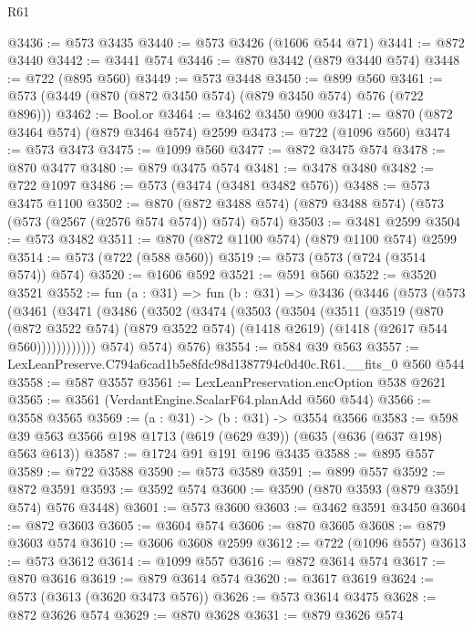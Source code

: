 \begin{lexlean}{R61}
\begin{coremodule}
@3436 := @573 @3435
@3440 := @573 @3426 (@1606 @544 @71)
@3441 := @872 @3440
@3442 := @3441 @574
@3446 := @870 @3442 (@879 @3440 @574)
@3448 := @722 (@895 @560)
@3449 := @573 @3448
@3450 := @899 @560
@3461 := @573 (@3449 (@870 (@872 @3450 @574) (@879 @3450 @574) @576 (@722 @896)))
@3462 := Bool.or
@3464 := @3462 @3450 @900
@3471 := @870 (@872 @3464 @574) (@879 @3464 @574) @2599
@3473 := @722 (@1096 @560)
@3474 := @573 @3473
@3475 := @1099 @560
@3477 := @872 @3475 @574
@3478 := @870 @3477
@3480 := @879 @3475 @574
@3481 := @3478 @3480
@3482 := @722 @1097
@3486 := @573 (@3474 (@3481 @3482 @576))
@3488 := @573 @3475 @1100
@3502 := @870 (@872 @3488 @574) (@879 @3488 @574) (@573 (@573 (@2567 (@2576 @574 @574)) @574) @574)
@3503 := @3481 @2599
@3504 := @573 @3482
@3511 := @870 (@872 @1100 @574) (@879 @1100 @574) @2599
@3514 := @573 (@722 (@588 @560))
@3519 := @573 (@573 (@724 (@3514 @574)) @574)
@3520 := @1606 @592
@3521 := @591 @560
@3522 := @3520 @3521
@3552 := fun (a : @31) =>
  fun (b : @31) =>
  @3436
    (@3446
      (@573
        (@573
          (@3461
            (@3471
              (@3486
                (@3502
                  (@3474
                    (@3503
                      (@3504
                        (@3511
                          (@3519
                            (@870
                              (@872 @3522 @574)
                              (@879 @3522 @574)
                              (@1418 @2619)
                              (@1418 (@2617 @544 @560))))))))))))
          @574)
        @574)
      @576)
@3554 := @584 @39 @563
@3557 := LexLeanPreserve.C794a6cad1b5e8fdc98d1387794c0d40c.R61.__fits_0 @560 @544
@3558 := @587 @3557
@3561 := LexLeanPreservation.encOption @538 @2621
@3565 := @3561 (VerdantEngine.ScalarF64.planAdd @560 @544)
@3566 := @3558 @3565
@3569 := (a : @31) -> (b : @31) -> @3554 @3566
@3583 := @598 @39 @563 @3566 @198 @1713 (@619 (@629 @39)) (@635 (@636 (@637 @198) @563 @613))
@3587 := @1724 @91 @191 @196 @3435
@3588 := @895 @557
@3589 := @722 @3588
@3590 := @573 @3589
@3591 := @899 @557
@3592 := @872 @3591
@3593 := @3592 @574
@3600 := @3590 (@870 @3593 (@879 @3591 @574) @576 @3448)
@3601 := @573 @3600
@3603 := @3462 @3591 @3450
@3604 := @872 @3603
@3605 := @3604 @574
@3606 := @870 @3605
@3608 := @879 @3603 @574
@3610 := @3606 @3608 @2599
@3612 := @722 (@1096 @557)
@3613 := @573 @3612
@3614 := @1099 @557
@3616 := @872 @3614 @574
@3617 := @870 @3616
@3619 := @879 @3614 @574
@3620 := @3617 @3619
@3624 := @573 (@3613 (@3620 @3473 @576))
@3626 := @573 @3614 @3475
@3628 := @872 @3626 @574
@3629 := @870 @3628
@3631 := @879 @3626 @574

\end{coremodule}
\end{lexlean}
